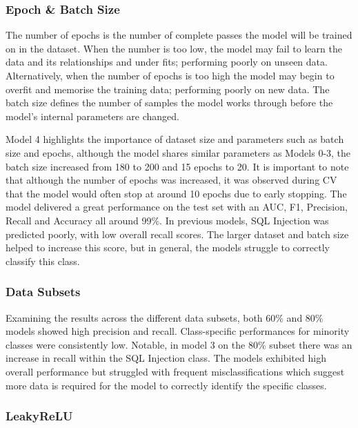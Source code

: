 \subsubsection*{Epoch \& Batch Size}

The number of epochs is the number of complete passes the model will be trained on in the dataset. When the number is too low, the model may fail to learn the data and its relationships and under fits; performing poorly on unseen data. Alternatively, when the number of epochs is too high the model may begin to overfit and memorise the training data; performing poorly on new data. The batch size defines the number of samples the model works through before the model's internal parameters are changed. %

Model 4 highlights the importance of dataset size and parameters such as batch size and epochs, although the model shares similar parameters as Models 0-3, the batch size increased from 180 to 200 and 15 epochs to 20. It is important to note that although the number of epochs was increased, it was observed during CV that the model would often stop at around 10 epochs due to early stopping. The model delivered a great performance on the test set with an AUC, F1, Precision, Recall and Accuracy all around 99\%. In previous models, SQL Injection was predicted poorly, with low overall recall scores. The larger dataset and batch size helped to increase this score, but in general, the models struggle to correctly classify this class. 


\subsubsection*{Data Subsets}

Examining the results across the different data subsets, both 60\% and 80\% models showed high precision and recall. Class-specific performances for minority classes were consistently low. Notable, in model 3 on the 80\% subset there was an increase in recall within the SQL Injection class. The models exhibited high overall performance but struggled with frequent misclassifications which suggest more data is required for the model to correctly identify the specific classes.

\subsubsection*{LeakyReLU}

